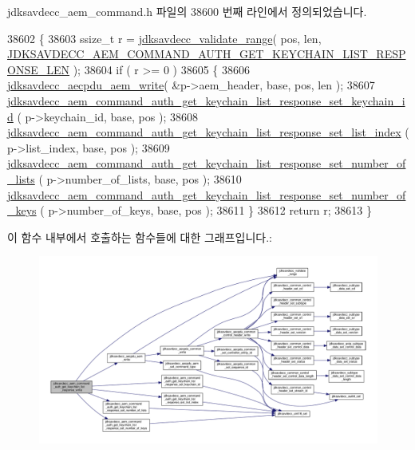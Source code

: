 jdksavdecc\+\_\+aem\+\_\+command.\+h 파일의 38600 번째 라인에서 정의되었습니다.


\begin{DoxyCode}
38602 \{
38603     ssize\_t r = \hyperlink{group__util_ga9c02bdfe76c69163647c3196db7a73a1}{jdksavdecc\_validate\_range}( pos, len, 
      \hyperlink{group__command__auth__get__keychain__list__response_ga884aaa001eecfb7bfea4d495ad8f31a0}{JDKSAVDECC\_AEM\_COMMAND\_AUTH\_GET\_KEYCHAIN\_LIST\_RESPONSE\_LEN}
       );
38604     \textcolor{keywordflow}{if} ( r >= 0 )
38605     \{
38606         \hyperlink{group__aecpdu__aem_gad658e55771cce77cecf7aae91e1dcbc5}{jdksavdecc\_aecpdu\_aem\_write}( &p->aem\_header, base, pos, len );
38607         \hyperlink{group__command__auth__get__keychain__list__response_gaefdd01beb92cac17455af0ad0efd40eb}{jdksavdecc\_aem\_command\_auth\_get\_keychain\_list\_response\_set\_keychain\_id}
      ( p->keychain\_id, base, pos );
38608         \hyperlink{group__command__auth__get__keychain__list__response_ga9567a961bc439fd27ff40c498161f80b}{jdksavdecc\_aem\_command\_auth\_get\_keychain\_list\_response\_set\_list\_index}
      ( p->list\_index, base, pos );
38609         
      \hyperlink{group__command__auth__get__keychain__list__response_ga1f22774fd28056c38a2ad443b9f52cd8}{jdksavdecc\_aem\_command\_auth\_get\_keychain\_list\_response\_set\_number\_of\_lists}
      ( p->number\_of\_lists, base, pos );
38610         
      \hyperlink{group__command__auth__get__keychain__list__response_ga3c3b66616f9affa6b50e9aad20b1ed24}{jdksavdecc\_aem\_command\_auth\_get\_keychain\_list\_response\_set\_number\_of\_keys}
      ( p->number\_of\_keys, base, pos );
38611     \}
38612     \textcolor{keywordflow}{return} r;
38613 \}
\end{DoxyCode}


이 함수 내부에서 호출하는 함수들에 대한 그래프입니다.\+:
\nopagebreak
\begin{figure}[H]
\begin{center}
\leavevmode
\includegraphics[width=350pt]{group__command__auth__get__keychain__list__response_gafae59cc4237dc4d17a74510057084ff6_cgraph}
\end{center}
\end{figure}


